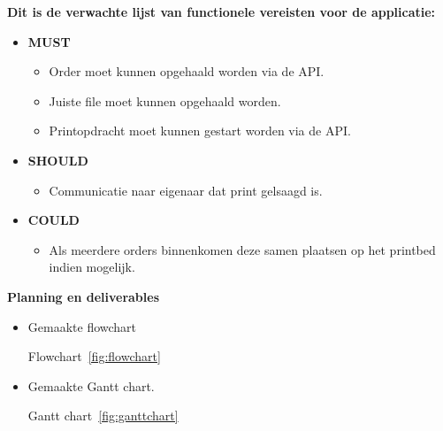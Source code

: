 \vspace{1em}
\textbf{Dit is de verwachte lijst van functionele vereisten voor de applicatie:}\\
\begin{itemize}
    \item \textbf{MUST}
    \begin{itemize}
        \item Order moet kunnen opgehaald worden  via de API.
        \item Juiste file moet kunnen opgehaald worden.
        \item Printopdracht moet kunnen gestart worden via de API.
    \end{itemize}
    \item \textbf{SHOULD}
    \begin{itemize}
        \item Communicatie naar eigenaar dat print gelsaagd is.
    \end{itemize}
    \item \textbf{COULD}
    \begin{itemize}
        \item Als meerdere orders binnenkomen deze samen plaatsen op het printbed indien mogelijk.
    \end{itemize}
\end{itemize}

\vspace{1em}
\textbf{Planning en deliverables}

\begin{itemize}
 \item Gemaakte flowchart

Flowchart~\ref{fig:flowchart}

 \item Gemaakte Gantt chart.

Gantt chart~\ref{fig:ganttchart}
\end{itemize}




